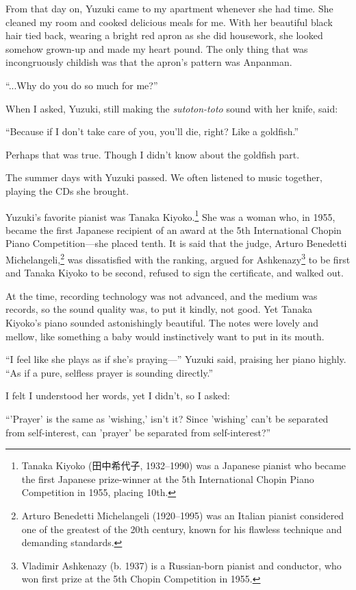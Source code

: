 \documentclass[
    a4paper,
    12pt,
    twoside,
    openany,
    UTF8,
    fontset=windows
]{ctexbook}
\begin{document}
From that day on, Yuzuki came to my apartment whenever she had time. She cleaned my room and cooked delicious meals for me. With her beautiful black hair tied back, wearing a bright red apron as she did housework, she looked somehow grown-up and made my heart pound. The only thing that was incongruously childish was that the apron's pattern was Anpanman.

``...Why do you do so much for me?''

When I asked, Yuzuki, still making the \textit{sutoton-toto} sound with her knife, said:

``Because if I don't take care of you, you'll die, right? Like a goldfish.''

Perhaps that was true. Though I didn't know about the goldfish part.

The summer days with Yuzuki passed. We often listened to music together, playing the CDs she brought.

Yuzuki's favorite pianist was Tanaka Kiyoko.\footnote{Tanaka Kiyoko (田中希代子, 1932--1990) was a Japanese pianist who became the first Japanese prize-winner at the 5th International Chopin Piano Competition in 1955, placing 10th.} She was a woman who, in 1955, became the first Japanese recipient of an award at the 5th International Chopin Piano Competition---she placed tenth. It is said that the judge, Arturo Benedetti Michelangeli,\footnote{Arturo Benedetti Michelangeli (1920--1995) was an Italian pianist considered one of the greatest of the 20th century, known for his flawless technique and demanding standards.} was dissatisfied with the ranking, argued for Ashkenazy\footnote{Vladimir Ashkenazy (b. 1937) is a Russian-born pianist and conductor, who won first prize at the 5th Chopin Competition in 1955.} to be first and Tanaka Kiyoko to be second, refused to sign the certificate, and walked out.

At the time, recording technology was not advanced, and the medium was records, so the sound quality was, to put it kindly, not good. Yet Tanaka Kiyoko's piano sounded astonishingly beautiful. The notes were lovely and mellow, like something a baby would instinctively want to put in its mouth.

``I feel like she plays as if she's praying---'' Yuzuki said, praising her piano highly. ``As if a pure, selfless prayer is sounding directly.''

I felt I understood her words, yet I didn't, so I asked:

``'Prayer' is the same as 'wishing,' isn't it? Since 'wishing' can't be separated from self-interest, can 'prayer' be separated from self-interest?''
\end{document}
